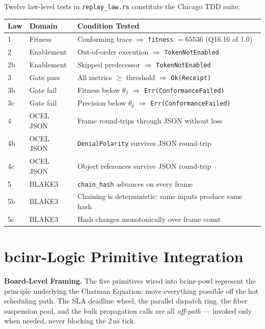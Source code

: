 \documentclass[12pt,a4paper]{article}
\theoremstyle{definition}
\theoremstyle{remark}
\newcommand{\execinsight}[2]{%
  \begin{execbox}
    \textbf{\color{chatblue}#1}\quad #2
  \end{execbox}}
\begin{document}
Twelve law-level tests in \texttt{replay\_law.rs} constitute the Chicago TDD suite:

\begin{center}
\renewcommand{\arraystretch}{1.15}
\begin{tabularx}{\textwidth}{llX}
\toprule
\textbf{Law} & \textbf{Domain} & \textbf{Condition Tested} \\
\midrule
1    & Fitness & Conforming trace $\Rightarrow$ \texttt{fitness} $= 65536$ (Q16.16 of 1.0) \\
2    & Enablement & Out-of-order execution $\Rightarrow$ \texttt{TokenNotEnabled} \\
2b   & Enablement & Skipped predecessor $\Rightarrow$ \texttt{TokenNotEnabled} \\
3    & Gate pass  & All metrics $\geq$ threshold $\Rightarrow$ \texttt{Ok(Receipt)} \\
3b   & Gate fail  & Fitness below $\theta_f$ $\Rightarrow$ \texttt{Err(ConformanceFailed)} \\
3c   & Gate fail  & Precision below $\theta_p$ $\Rightarrow$ \texttt{Err(ConformanceFailed)} \\
4    & OCEL JSON  & Frame round-trips through JSON without loss \\
4b   & OCEL JSON  & \texttt{DenialPolarity} survives JSON round-trip \\
4c   & OCEL JSON  & Object references survive JSON round-trip \\
5    & BLAKE3     & \texttt{chain\_hash} advances on every frame \\
5b   & BLAKE3     & Chaining is deterministic: same inputs produce same hash \\
5c   & BLAKE3     & Hash changes monotonically over frame count \\
\bottomrule
\end{tabularx}
\end{center}

\section{bcinr-Logic Primitive Integration}
\label{sec:primitives}

\execinsight{Board-Level Framing.}{%
The five primitives wired into bcinr-powl represent the principle underlying
the Chatman Equation: move everything possible off the hot scheduling path.
The SLA deadline wheel, the parallel dispatch ring, the fiber suspension pool,
and the bulk propagation calls are all \emph{off-path} --- invoked only when needed,
never blocking the 2\,ns tick.}
\end{document}
